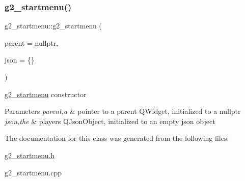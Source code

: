 \subsubsection{\texorpdfstring{g2\+\_\+startmenu()}{g2\_startmenu()}}
{\footnotesize\ttfamily g2\+\_\+startmenu\+::g2\+\_\+startmenu (\begin{DoxyParamCaption}\item[{Q\+Widget $\ast$}]{parent = {\ttfamily nullptr},  }\item[{Q\+Json\+Object}]{json = {\ttfamily \{\}} }\end{DoxyParamCaption})\hspace{0.3cm}{\ttfamily [explicit]}}



\hyperlink{classg2__startmenu}{g2\+\_\+startmenu} constructor 


\begin{DoxyParams}{Parameters}
{\em parent,a} & pointer to a parent Q\+Widget, initialized to a nullptr \\
\hline
{\em json,the} & player\textquotesingle{}s Q\+Json\+Object, initialized to an empty json object \\
\hline
\end{DoxyParams}


The documentation for this class was generated from the following files\+:\begin{DoxyCompactItemize}
\item 
\hyperlink{g2__startmenu_8h}{g2\+\_\+startmenu.\+h}\item 
g2\+\_\+startmenu.\+cpp\end{DoxyCompactItemize}
